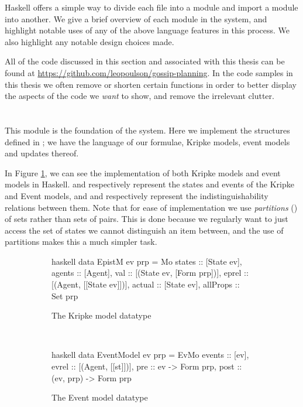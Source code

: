 \documentclass[ %
                    author={Leo Poulson},
                supervisor={Dr. Steven Ramsay},
                    degree={BSc},
                     title={Epistemic Planning for the Dynamic Gossip problem},
                  subtitle={},
                      year={2019} ]{dissertation}
\begin{document}
Haskell offers a simple way to divide each file into a module and import a
module into another. We give a brief overview of each module in the system, and
highlight notable uses of any of the above language features in this process. We
also highlight any notable design choices made.

All of the code discussed in this section and associated with this thesis can be
found at \url{https://github.com/leopoulson/gossip-planning}. In the code
samples in this thesis we often remove or shorten certain functions in order to
better display the aspects of the code we \emph{want} to show, and remove the
irrelevant clutter. 

\section{}

This module is the foundation of the system. Here we implement the structures
defined in ; we have the language of our formulae, Kripke
models, event models and updates thereof.

In Figure \ref{fig:HaskellModels}, we can see the implementation of both Kripke
models and event models in Haskell.  and 
respectively represent the states and events of the Kripke and Event models, and
 and  respectively represent the
indistinguishability relations between them. Note that for ease of
implementation we use \emph{partitions} (\cite{EREL}) of sets rather than sets
of pairs. This is done because we regularly want to just access the set of
states we cannot distinguish an item between, and the use of partitions makes
this a much simpler task. 

\begin{figure}[h]
  \begin{subfigure}[b]{0.5\textwidth}
    \begin{cminted}{haskell}
      data EpistM ev prp = Mo {
        states :: [State ev],                  
        agents :: [Agent],              
        val :: [(State ev, [Form prp])],         
        eprel :: [(Agent, [[State ev]])],
        actual :: [State ev],              
        allProps :: Set prp
      }
    \end{cminted}
    \caption{The Kripke model datatype}
  \end{subfigure}%
~
  \begin{subfigure}[b]{0.5\textwidth}
    \begin{cminted}{haskell}
      data EventModel ev prp = EvMo {
        events :: [ev],
        evrel :: [(Agent, [[st]])],
        pre :: ev -> Form prp,
        post :: (ev, prp) -> Form prp
      }
    \end{cminted}
    \caption{The Event model datatype}
  \end{subfigure}
  \caption{}
  \label{fig:HaskellModels}
\end{figure}
\end{document}
